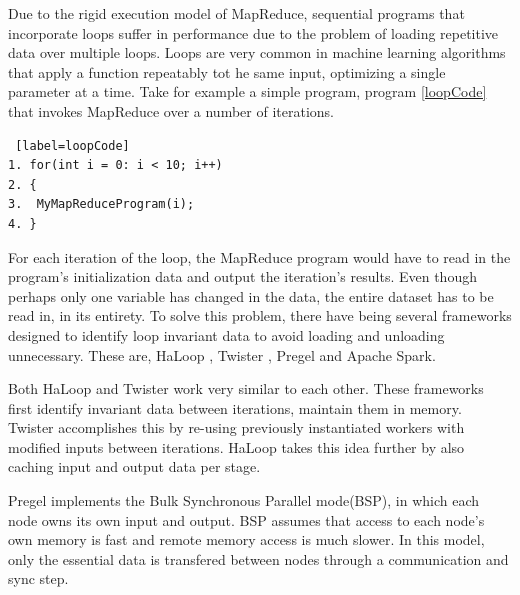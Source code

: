\documentclass[10pt,twocolumn]{IEEEtran11}
\begin{document}
Due to the rigid execution model of MapReduce, sequential programs that incorporate loops suffer in performance due to the problem of loading repetitive data over multiple loops. Loops are very common in machine learning algorithms that apply a function repeatably tot he same input, optimizing a single parameter at a time. Take for example a simple program, program \ref{loopCode} that invokes MapReduce over a number of iterations.

\begin{lstlisting} [label=loopCode]
1. for(int i = 0: i < 10; i++)
2. {
3. 	MyMapReduceProgram(i);
4. }
\end{lstlisting}

For each iteration of the loop, the MapReduce program would have to read in the program's initialization data and output the iteration's results.  Even though perhaps only one variable has changed in the data, the entire dataset has to be read in, in its entirety.  To solve this problem, there have being several frameworks designed to identify loop invariant data to avoid loading and unloading unnecessary.   These are, HaLoop \cite{bu2010haloop}, Twister \cite{ekanayake2010twister},  Pregel \cite{malewicz2010pregel} and Apache Spark\cite{zaharia2010spark}. 
\par
Both HaLoop and Twister work very similar to each other.  These frameworks first identify invariant data between iterations, maintain them in memory.  Twister accomplishes this by re-using previously instantiated workers with modified inputs between iterations.  HaLoop takes this idea further by also caching input and output data per stage.
\par
Pregel implements the Bulk Synchronous Parallel mode(BSP), in which each node owns its own input and output.  BSP assumes that access to each node's own memory is fast and remote memory access is much slower.  In this model, only the essential data is transfered between nodes through a communication and sync step.  
\end{document}
